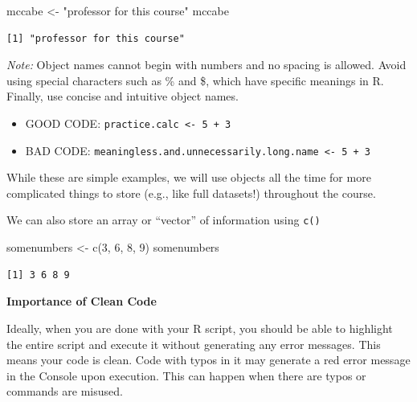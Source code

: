 \documentclass[
  letterpaper,
  DIV=11,
  numbers=noendperiod]{scrreprt}
\newenvironment{Shaded}{\begin{snugshade}}{\end{snugshade}}
\newcommand{\DecValTok}[1]{\textcolor[rgb]{0.68,0.00,0.00}{#1}}
\newcommand{\FunctionTok}[1]{\textcolor[rgb]{0.28,0.35,0.67}{#1}}
\newcommand{\NormalTok}[1]{\textcolor[rgb]{0.00,0.23,0.31}{#1}}
\newcommand{\OtherTok}[1]{\textcolor[rgb]{0.00,0.23,0.31}{#1}}
\newcommand{\StringTok}[1]{\textcolor[rgb]{0.13,0.47,0.30}{#1}}
\providecommand{\tightlist}{%
  \setlength{\itemsep}{0pt}\setlength{\parskip}{0pt}}\usepackage{longtable,booktabs,array}
\begin{document}
\begin{Shaded}
\begin{Highlighting}[]
\NormalTok{mccabe }\OtherTok{\textless{}{-}} \StringTok{"professor for this course"}
\NormalTok{mccabe}
\end{Highlighting}
\end{Shaded}

\begin{verbatim}
[1] "professor for this course"
\end{verbatim}

\emph{Note:} Object names cannot begin with numbers and no spacing is
allowed. Avoid using special characters such as \% and \$, which have
specific meanings in R. Finally, use concise and intuitive object names.

\begin{itemize}
\tightlist
\item
  GOOD CODE: \texttt{practice.calc\ \textless{}-\ 5\ +\ 3}
\item
  BAD CODE:
  \texttt{meaningless.and.unnecessarily.long.name\ \textless{}-\ 5\ +\ 3}
\end{itemize}

While these are simple examples, we will use objects all the time for
more complicated things to store (e.g., like full datasets!) throughout
the course.

We can also store an array or ``vector'' of information using
\texttt{c()}

\begin{Shaded}
\begin{Highlighting}[]
\NormalTok{somenumbers }\OtherTok{\textless{}{-}} \FunctionTok{c}\NormalTok{(}\DecValTok{3}\NormalTok{, }\DecValTok{6}\NormalTok{, }\DecValTok{8}\NormalTok{, }\DecValTok{9}\NormalTok{)}
\NormalTok{somenumbers}
\end{Highlighting}
\end{Shaded}

\begin{verbatim}
[1] 3 6 8 9
\end{verbatim}

\textbf{Importance of Clean Code}

Ideally, when you are done with your R script, you should be able to
highlight the entire script and execute it without generating any error
messages. This means your code is clean. Code with typos in it may
generate a red error message in the Console upon execution. This can
happen when there are typos or commands are misused.
\end{document}
